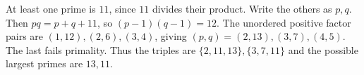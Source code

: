 At least one prime is $11$, since $11$ divides their product. Write the others as $p,q$. Then $pq=p+q+11$, so $(p-1)(q-1)=12$. The unordered positive factor pairs are $(1,12),(2,6),(3,4)$, giving $(p,q)=(2,13),(3,7),(4,5)$. The last fails primality. Thus the triples are $\boxed{\{2,11,13\},\{3,7,11\}}$ and the possible largest primes are $\boxed{13,11}$.
